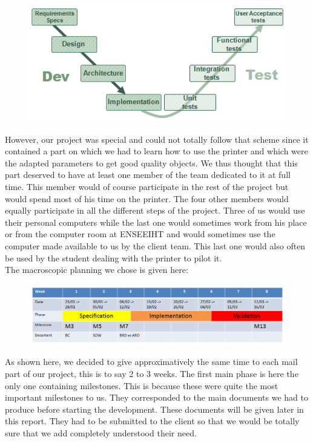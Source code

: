 \documentclass{report}
\begin{document}
\begin{figure}[!h]
\begin{center}
	\includegraphics[scale=4.5]{VCycle}
\end{center}
\end{figure}

However, our project was special and could not totally follow that scheme since it contained a part on which we had to learn how to use the printer and which were the adapted parameters to get good quality objects. We thus thought that this part deserved to have at least one member of the team dedicated to it at full time. This member would of course participate in the rest of the project but would spend most of his time on the printer. The four other members would equally participate in all the different steps of the project. Three of us would use their personal computers while the last one would sometimes work from his place or from the computer room at ENSEEIHT and would sometimes use the computer made available to us by the client team. This last one would also often be used by the student dealing with the printer to pilot it.\\

The macroscopic planning we chose is given here:

\bigskip
\begin{figure}[!h]
\begin{center}
	\includegraphics[scale=0.4]{PlanningMacroscopique}
\end{center}
\end{figure}

As shown here, we decided to give approximatively the same time to each mail part of our project, this is to say 2 to 3 weeks. The first main phase is here the only one containing milestones. This is because these were quite the most important milestones to us. They corresponded to the main documents we had to produce before starting the development. These documents will be given later in this report. They had to be submitted to the client so that we would be totally sure that we add completely understood their need. \\
\end{document}

